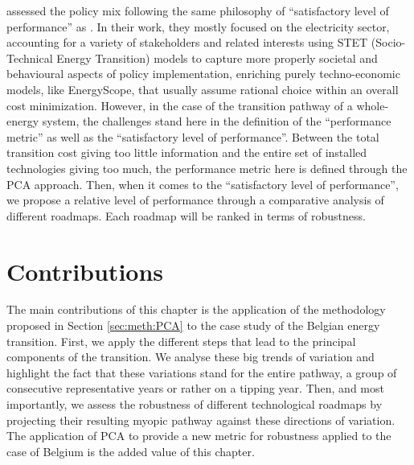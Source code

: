 \citet{castrejon2020making} assessed the policy mix following the same philosophy of ``satisfactory level of performance'' as \cite{walker2012deep}. In their work, they mostly focused on the electricity sector, accounting for a variety of stakeholders and related interests using STET (Socio-Technical Energy Transition) models to capture more properly societal and behavioural aspects of policy implementation, enriching purely techno-economic models, like EnergyScope, that usually assume rational choice within an overall cost minimization.  However, in the case of the transition pathway of a whole-energy system, the challenges stand here in the definition of the ``performance metric'' as well as the ``satisfactory level of performance''. Between the total transition cost giving too little information and the entire set of installed technologies giving too much, the performance metric here is defined through the \gls{PCA} approach. Then, when it comes to the ``satisfactory level of performance'', we propose a relative level of performance through a comparative analysis of different roadmaps. Each roadmap will be ranked in terms of robustness.

\section*{Contributions}
\label{sec:RobPol:contributions}
The main contributions of this chapter is the application of the methodology proposed in Section \ref{sec:meth:PCA} to the case study of the Belgian energy transition. First, we apply the different steps that lead to the principal components of the transition. We analyse these big trends of variation and highlight the fact that these variations stand for the entire pathway, a group of consecutive representative years or rather on a tipping year. Then, and most importantly, we assess the robustness of different technological roadmaps by projecting their resulting myopic pathway against these directions of variation. The application of \gls{PCA} to provide a new metric for robustness applied to the case of Belgium is the added value of this chapter.


